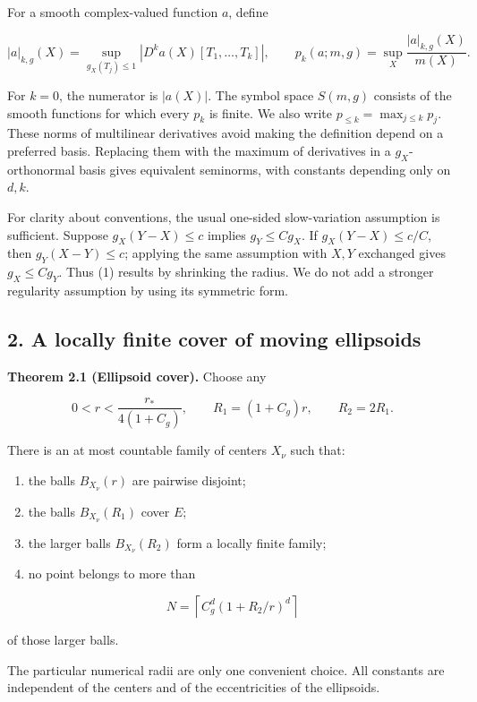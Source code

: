 \documentclass[
  11pt,
]{article}
\providecommand{\tightlist}{%
  \setlength{\itemsep}{0pt}\setlength{\parskip}{0pt}}
\begin{document}
For a smooth complex-valued function \(a\), define

\[
|a|_{k,g}(X)=
\sup_{g_X(T_j)\leq1}
\left|D^k a(X)[T_1,\ldots,T_k]\right|,
\qquad
p_k(a;m,g)=\sup_X\frac{|a|_{k,g}(X)}{m(X)}.       \tag{3}
\]

For \(k=0\), the numerator is \(|a(X)|\). The symbol space \(S(m,g)\)
consists of the smooth functions for which every \(p_k\) is finite. We
also write \(p_{\leq k}=\max_{j\leq k}p_j\). These norms of multilinear
derivatives avoid making the definition depend on a preferred basis.
Replacing them with the maximum of derivatives in a \(g_X\)-orthonormal
basis gives equivalent seminorms, with constants depending only on
\(d,k\).

For clarity about conventions, the usual one-sided slow-variation
assumption is sufficient. Suppose \(g_X(Y-X)\leq c\) implies
\(g_Y\leq Cg_X\). If \(g_X(Y-X)\leq c/C\), then \(g_Y(X-Y)\leq c\);
applying the same assumption with \(X,Y\) exchanged gives
\(g_X\leq Cg_Y\). Thus (1) results by shrinking the radius. We do not
add a stronger regularity assumption by using its symmetric form.

\subsection{2. A locally finite cover of moving
ellipsoids}\label{a-locally-finite-cover-of-moving-ellipsoids}

\textbf{Theorem 2.1 (Ellipsoid cover).} Choose any

\[
0<r<\frac{r_*}{4(1+C_g)},\qquad R_1=(1+C_g)r,
\qquad R_2=2R_1.
\]

There is an at most countable family of centers \(X_\nu\) such that:

\begin{enumerate}
\def\labelenumi{\arabic{enumi}.}
\tightlist
\item
  the balls \(B_{X_\nu}(r)\) are pairwise disjoint;
\item
  the balls \(B_{X_\nu}(R_1)\) cover \(E\);
\item
  the larger balls \(B_{X_\nu}(R_2)\) form a locally finite family;
\item
  no point belongs to more than
\end{enumerate}

\[
N=\left\lceil C_g^d\left(1+R_2/r\right)^d\right\rceil               \tag{4}
\]

of those larger balls.

The particular numerical radii are only one convenient choice. All
constants are independent of the centers and of the eccentricities of
the ellipsoids.
\end{document}
